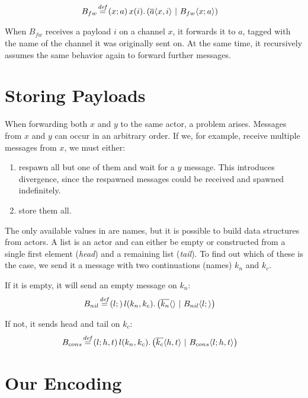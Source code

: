 \begin{align*}
  \adef*{B_{fw}}{x}{a}{\arcv{x}{i} . \parens{\asnd{a}{x,i} \apar \ains{B_{fw}}{x}{a}}}
\end{align*}

When $B_{fw}$ receives a payload $i$ on a channel $x$,
it forwards it to $a$, tagged with the name of the channel it was originally
sent on.
At the same time, it recursively assumes the same behavior again to
forward further messages.


\section{Storing Payloads}

When forwarding both $x$ and $y$ to the same actor, a problem arises.
Messages from $x$ and $y$ can occur in an arbitrary order.
If we, for example, receive multiple messages from $x$, we must either:
\begin{enumerate}[nosep]
  \item
    respawn all but one of them and wait for a $y$ message.
    This introduces divergence, since the respawned messages could be
    received and spawned indefinitely.
  \item
    store them all.
\end{enumerate}

The only available values in \actorpicalc are names,
but it is possible to build data structures from actors.
A list is an actor and can either be empty or constructed from a single
first element (\emph{head}) and a remaining list (\emph{tail}).
To find out which of these is the case, we send it a message with two
continuations (names) $k_n$ and $k_c$.

If it is empty, it will send an empty message on $k_n$:
\begin{align*}
  \adef*{B_{nil}}{l}{}{\arcv{l}{k_n,k_c} . \parens{\asnd{k_n}{} \apar \ains{B_{nil}}{l}{}}}
\end{align*}

If not, it sends head and tail on $k_c$:
\begin{align*}
  \adef*{B_{cons}}{l}{h,t}{\arcv{l}{k_n,k_c} . \parens{\asnd{k_c}{h,t} \apar \ains{B_{cons}}{l}{h,t}}}
\end{align*}


\section{Our Encoding}

